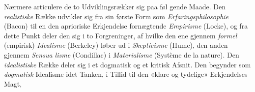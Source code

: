\documentclass[12pt,a4paper]{book}
\begin{document}
Nærmere articulere de to Udviklingsrækker sig paa føl\-%
gende Maade. Den \emph{realistiske} Række udvikler sig fra sin
første Form som \emph{Erfaringsphilosophie} (Bacon) til en den
aprioriske Erkjendelse fornægtende \emph{Empirisme} (Locke), og
fra dette Punkt deler den sig i to Forgreninger, af hvilke den
ene gjennem \emph{formel} (empirisk) \emph{Idealisme} (Berkeley) løber
ud i \emph{Skepticisme} (Hume), den anden gjennem \emph{Sensua\-%
lisme} (Condillac) i \emph{Materialisme} (Système de la nature).
Den \emph{idealistiske} Række deler sig i et dogmatisk og et
kritisk Afsnit. Den begynder som \emph{dogmatisk} Idealisme idet
Tanken, i Tillid til den «klare og tydelige» Erkjendelses Magt,
\end{document}
